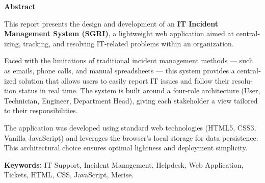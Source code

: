 \documentclass[12pt,a4paper,oneside]{report}
\begin{document}
\clearpage
{}
{}
\begin{otherlanguage}{english}
\vspace*{\fill}

\begin{center}
\Huge\bfseries\color{darkbg} Abstract
\vspace{1.5cm}
\end{center}

\normalsize\normalfont
\justifying

This report presents the design and development of an \textbf{IT Incident Management System (SGRI)}, a lightweight web application aimed at centralizing, tracking, and resolving IT-related problems within an organization.

\vspace{0.5cm}

Faced with the limitations of traditional incident management methods --- such as emails, phone calls, and manual spreadsheets --- this system provides a centralized solution that allows users to easily report IT issues and follow their resolution status in real time. The system is built around a four-role architecture (User, Technician, Engineer, Department Head), giving each stakeholder a view tailored to their responsibilities.

\vspace{0.5cm}

The application was developed using standard web technologies (HTML5, CSS3, Vanilla JavaScript) and leverages the browser's local storage for data persistence. This architectural choice ensures optimal lightness and deployment simplicity.

\vspace{0.8cm}

\noindent\textbf{Keywords:} IT Support, Incident Management, Helpdesk, Web Application, Tickets, HTML, CSS, JavaScript, Merise.

\vspace*{\fill}
\end{otherlanguage}

\newpage
\listoftables
{}

\newpage
\listoffigures
{}
\end{document}
